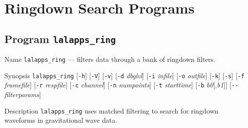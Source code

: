 \chapter{Ringdown Search Programs}
\label{chapter:ringdown}

\section{Program \texttt{lalapps\_ring}}
\label{program:lalapps-ring}

\begin{entry}

\item[Name]
\verb$lalapps_ring$ --- filters data through a bank of ringdown filters.

\item[Synopsis]
\verb$lalapps_ring$ [\verb$-h$] [\verb$-V$] [\verb$-v$]
  [\verb$-d$ \textit{dbglvl}] [\verb$-i$ \textit{infile}]
  [\verb$-o$ \textit{outfile}] [\verb$-k$] [\verb$-s$]
  [\verb$-f$ \textit{framefile}] [\verb$-r$ \textit{respfile}]
  [\verb$-c$ \textit{channel}] [\verb$-n$ \textit{numpoints}]
  [\verb$-t$ \textit{starttime}] [\verb$-b$ \textit{b0}[,\textit{b1}]]
  [\verb$--$ \textit{filterparams}]

\item[Description]
\verb$lalapps_ring$ uses matched filtering to search for ringdown waveforms in
gravitational wave data.


\end{entry}
